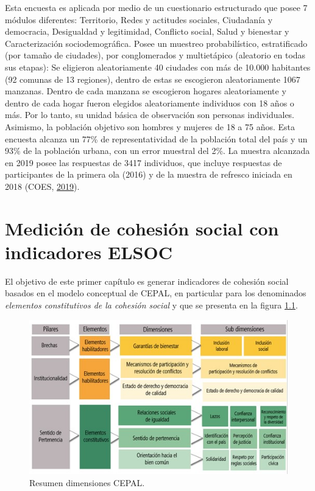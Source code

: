 \documentclass[
  12pt,
]{book}
\begin{document}
Esta encuesta es aplicada por medio de un cuestionario estructurado que posee 7 módulos diferentes: Territorio, Redes y actitudes sociales, Ciudadanía y democracia, Desigualdad y legitimidad, Conflicto social, Salud y bienestar y Caracterización sociodemográfica. Posee un muestreo probabilístico, estratificado (por tamaño de ciudades), por conglomerados y multietápico (aleatorio en todas sus etapas): Se eligieron aleatoriamente 40 ciudades con más de 10.000 habitantes (92 comunas de 13 regiones), dentro de estas se escogieron aleatoriamente 1067 manzanas. Dentro de cada manzana se escogieron hogares aleatoriamente y dentro de cada hogar fueron elegidos aleatoriamente individuos con 18 años o más. Por lo tanto, su unidad básica de observación son personas individuales. Asimismo, la población objetivo son hombres y mujeres de 18 a 75 años. Esta encuesta alcanza un 77\% de representatividad de la población total del país y un 93\% de la población urbana, con un error muestral del 2\%. La muestra alcanzada en 2019 posee las respuestas de 3417 individuos, que incluye respuestas de participantes de la primera ola (2016) y de la muestra de refresco iniciada en 2018 (COES, \protect\hyperlink{ref-coes_Radiografia_2019}{2019}).

\hypertarget{mediciuxf3n-de-cohesiuxf3n-social-con-indicadores-elsoc}{%
\chapter{Medición de cohesión social con indicadores ELSOC}\label{mediciuxf3n-de-cohesiuxf3n-social-con-indicadores-elsoc}}

El objetivo de este primer capítulo es generar indicadores de cohesión social basados en el modelo conceptual de CEPAL, en particular para los denominados \emph{elementos constitutivos de la cohesión social} y que se presenta en la figura \ref{fig:esquema-cepal}.

\begin{figure}[H]

{\centering \includegraphics[width=1\linewidth,height=1\textheight]{images/dimensiones-cepal} 

}

\caption{Resumen dimensiones CEPAL.}\label{fig:esquema-cepal}
\end{figure}
\end{document}
